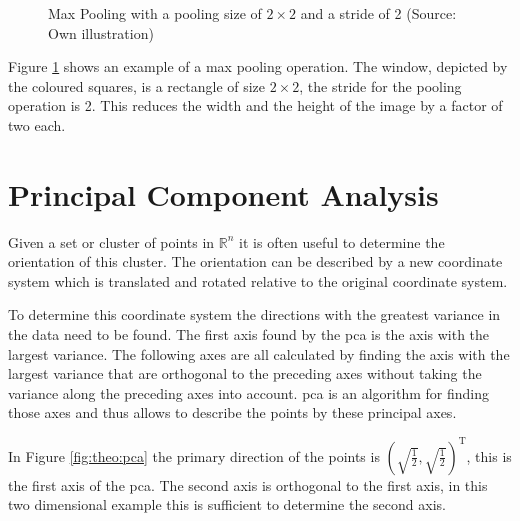 \begin{figure}[h!]
    \caption{Max Pooling with a pooling size of $2 \times 2$ and a stride of 2 (Source: Own illustration)}
    \label{fig:theo:maxPool}
\end{figure}

Figure \ref{fig:theo:maxPool} shows an example of a max pooling operation. The window, depicted by the coloured squares, is a rectangle of size $2 \times 2$, the stride for the pooling operation is 2. This reduces the width and the height of the image by a factor of two each.

\section{Principal Component Analysis}
Given a set or cluster of points in $\mathbb{R}^n$ it is often useful to determine the orientation of this cluster. The orientation can be described by a new coordinate system which is translated and rotated relative to the original coordinate system. 

To determine this coordinate system the directions with the greatest variance in the data need to be found.
The first axis found by the \ac{pca} is the axis with the largest variance.
The following axes are all calculated by finding the axis with the largest variance that are orthogonal to the preceding axes without taking the variance along the preceding axes into account.
\ac{pca} is an algorithm for finding those axes and thus allows to describe the points by these principal axes.

In Figure \ref{fig:theo:pca} the primary direction of the points is $ {\left(\sqrt{\frac{1}{2}},\sqrt{\frac{1}{2}}\right)}^\text{T}$, this is the first axis of the \ac{pca}. 
The second axis is orthogonal to the first axis, in this two dimensional example this is sufficient to determine the second axis.

